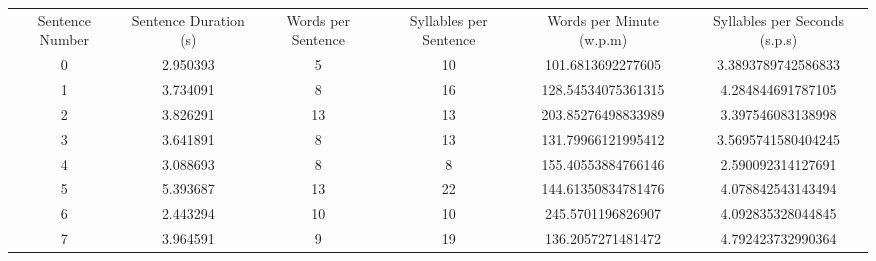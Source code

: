 \begin{tabular}{|C{0.1}C{0.2}C{0.15}C{0.15}C{0.23}C{0.23}|}
	\hline
	Sentence Number&Sentence Duration (s)&Words per Sentence&Syllables per Sentence&Words per Minute (w.p.m)&Syllables per Seconds (s.p.s)\\
0&2.950393&5&10&101.6813692277605&3.3893789742586833\\
1&3.734091&8&16&128.54534075361315&4.284844691787105\\
2&3.826291&13&13&203.85276498833989&3.397546083138998\\
3&3.641891&8&13&131.79966121995412&3.5695741580404245\\
4&3.088693&8&8&155.40553884766146&2.590092314127691\\
5&5.393687&13&22&144.61350834781476&4.078842543143494\\
6&2.443294&10&10&245.5701196826907&4.092835328044845\\
7&3.964591&9&19&136.2057271481472&4.792423732990364\\
\hline\end{tabular}